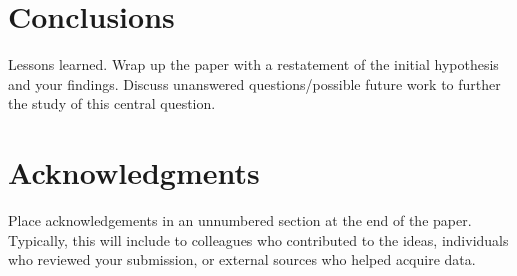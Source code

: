 \documentclass{article}
\begin{document}
\section{Conclusions}
\label{conclusion}

Lessons learned.  Wrap up the paper with a restatement of the initial hypothesis
and your findings.  Discuss unanswered questions/possible future work to further
the study of this central question.

\section*{Acknowledgments}


Place acknowledgements in an unnumbered section at the
end of the paper. Typically, this will include
to colleagues who contributed to the ideas, individuals who
reviewed your submission, or external sources who helped
acquire data.


\nocite{langley00}



\end{document}
